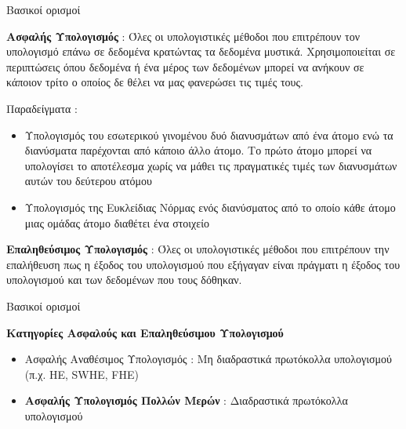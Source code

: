 \documentclass[10pt]{beamer}
\begin{document}
    \begin{frame}{Βασικοί ορισμοί}
        \begin{block}{}
            \textbf{Ασφαλής Υπολογισμός} : Όλες οι υπολογιστικές μέθοδοι που επιτρέπουν τον υπολογισμό επάνω σε δεδομένα κρατώντας τα δεδομένα μυστικά. Χρησιμοποιείται σε περιπτώσεις όπου δεδομένα ή ένα μέρος των δεδομένων μπορεί να ανήκουν σε κάποιον τρίτο ο οποίος δε θέλει να μας φανερώσει τις τιμές τους.
        \end{block}{}
        \begin{block}{}
            Παραδείγματα :
            \begin{itemize}
                \item Υπολογισμός του εσωτερικού γινομένου δυό διανυσμάτων από ένα άτομο ενώ τα διανύσματα παρέχονται από κάποιο άλλο άτομο. Το πρώτο άτομο μπορεί να υπολογίσει το αποτέλεσμα χωρίς να μάθει τις πραγματικές τιμές των διανυσμάτων αυτών του δεύτερου ατόμου
                \item Υπολογισμός της Ευκλείδιας Νόρμας ενός διανύσματος από το οποίο κάθε άτομο μιας ομάδας άτομο διαθέτει ένα στοιχείο
            \end{itemize}
        \end{block}
        \begin{block}{}
            \textbf{Επαληθεύσιμος Υπολογισμός} : Όλες οι υπολογιστικές μέθοδοι που επιτρέπουν την επαλήθευση πως η έξοδος του υπολογισμού που εξήγαγαν είναι πράγματι η έξοδος του υπολογισμού και των δεδομένων που τους δόθηκαν.
        \end{block}{}
    \end{frame}

    \begin{frame}{Βασικοί ορισμοί}
        \begin{block}{}
            \textbf{Κατηγορίες Ασφαλούς και Επαληθεύσιμου Υπολογισμού}
            \begin{itemize}
                \item Ασφαλής Αναθέσιμος Υπολογισμός : Μη διαδραστικά πρωτόκολλα υπολογισμού (π.χ. HE, SWHE, FHE)
                \item \textbf{Ασφαλής Υπολογισμός Πολλών Μερών} : Διαδραστικά πρωτόκολλα υπολογισμού
            \end{itemize}
        \end{block}
    \end{frame}
\end{document}
